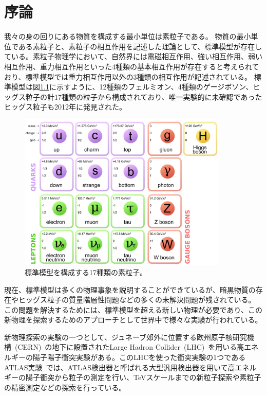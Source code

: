 \chapter{序論}
我々の身の回りにある物質を構成する最小単位は素粒子である。
物質の最小単位である素粒子と、素粒子の相互作用を記述した理論として、標準模型が存在している。素粒子物理学において、自然界には電磁相互作用、強い相互作用、弱い相互作用、重力相互作用といった4種類の基本相互作用が存在すると考えられており、標準模型では重力相互作用以外の3種類の相互作用が記述されている。
標準模型は図\ref{fig:標準模型}に示すように、12種類のフェルミオン、4種類のゲージボソン、ヒッグス粒子の計17種類の粒子から構成されており、唯一実験的に未確認であったヒッグス粒子も2012年に発見された\cite{article:Higgs_boson}。
\begin{figure}[tb]
  \centering
  \includegraphics[clip, width=10cm]{fig/1/standardmodel.jpg}
  \caption{標準模型を構成する17種類の素粒子\cite{article:elementary_particles}。}
  \label{fig:標準模型}
\end{figure}

現在、標準模型は多くの物理事象を説明することができているが、暗黒物質の存在やヒッグス粒子の質量階層性問題などの多くの未解決問題が残されている。
この問題を解決するためには、標準模型を超える新しい物理が必要であり、この新物理を探索するためのアプローチとして世界中で様々な実験が行われている。

新物理探索の実験の一つとして、ジュネーブ郊外に位置する欧州原子核研究機構~(CERN)~\cite{article:CERN}の地下に設置されたLarge Hadron Collider~(LHC)~\cite{article:LHC}を用いる高エネルギーの陽子陽子衝突実験がある。このLHCを使った衝突実験の1つであるATLAS実験~\cite{Aad:1129811}では、ATLAS検出器と呼ばれる大型汎用検出器を用いて高エネルギーの陽子衝突から粒子の測定を行い、TeVスケールまでの新粒子探索や素粒子の精密測定などの探索を行っている。

